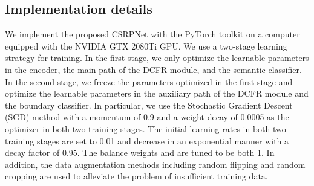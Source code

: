 \subsection{Implementation details}
We implement the proposed CSRPNet with the PyTorch toolkit on a computer equipped with the NVIDIA GTX 2080Ti GPU. We use a two-stage learning strategy for training. In the first stage, we only optimize the learnable parameters in the encoder, the main path of the DCFR module, and the semantic classifier. In the second stage, we freeze the parameters optimized in the first stage and optimize the learnable parameters in the auxiliary path of the DCFR module and the boundary classifier.
In particular, we use the Stochastic Gradient Descent (SGD) method with a momentum of 0.9 and a weight decay of 0.0005 as the optimizer in both two training stages. The initial learning rates in both two training stages are set to 0.01 and decrease in an exponential manner with a decay factor of 0.95. The balance weights  and  are tuned to be both 1. In addition, the data augmentation methods including random flipping and random cropping are used to alleviate the problem of insufficient training data.

\begin{table}[t]
\centering
{}
\setlength{\tabcolsep}{5pt}
\renewcommand{\arraystretch}{1.5}
\caption{\textbf{Experimental results of the six variants of our method on the MFNet dataset.} Herein dot product is used as the relation function. The best and second-best results are denoted by the bold font and the underline, respectively.}
\label{Table: ablation}
\end{table}

